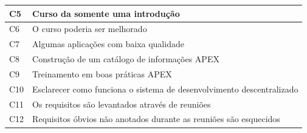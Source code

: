 \begin{longtable}{|M{1.3cm} | m{14.0cm}|}
C5             & Curso da somente uma introdução                                                                                                                                                                                                                                   \\ \hline
C6             & O curso poderia ser melhorado                                                                                                                                                                                                                                     \\ \hline
C7             & Algumas aplicações com baixa qualidade                                                                                                                                                                                                                            \\ \hline
C8             & Construção de um catálogo de informações APEX                                                                                                                                                                                                                     \\ \hline
C9             & Treinamento em boas práticas APEX                                                                                                                                                                                                                                 \\ \hline
C10            & Esclarecer como funciona o sistema de desenvolvimento descentralizado                                                                                                                                                                                             \\ \hline
C11            & Os requisitos são levantados através de reuniões                                                                                                                                                                                                                  \\ \hline
C12            & Requisitos óbvios não anotados durante as reuniões são esquecidos                                                                                                                                                                                                 \\ \hline

\end{longtable}
